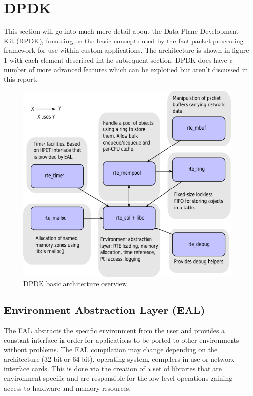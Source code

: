 \documentclass[final_report.tex]{subfiles}
\begin{document}
\section{DPDK}
\label{sec:dpdk}
This section will go into much more detail about the Data Plane Development Kit (DPDK), focussing on the basic concepts used by the fast packet processing framework for use within custom applications. The architecture is shown in figure \ref{fig:arch} with each element described int he subsequent section. DPDK does have a number of more advanced features which can be exploited but aren't discussed in this report.

\begin{figure}[H]
	\centering
	\includegraphics[width=\textwidth]{img/architecture-overview.png}
	\caption{DPDK basic architecture overview}
	\label{fig:arch}
\end{figure}

\subsection{Environment Abstraction Layer (EAL)}
The EAL abstracts the specific environment from the user and provides a constant interface in order for applications to be ported to other environments without problems. The EAL compilation may change depending on the architecture (32-bit or 64-bit), operating system, compilers in use or network interface cards. This is done via the creation of a set of libraries that are environment specific and are responsible for the low-level operations gaining access to hardware and memory resources.
\end{document}
